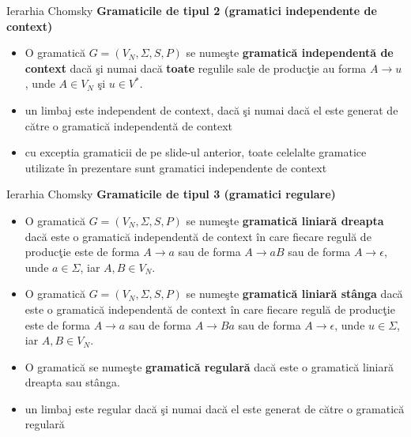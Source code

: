 \documentclass[pdf]{beamer}
\begin{document}
\begin{frame}{Ierarhia Chomsky}
\textbf{Gramaticile de tipul 2 (gramatici independente de context)}
\begin{itemize}
\item
O gramatică $G = (V_{N}, \Sigma, S, P )$ se numeşte \textbf{gramatică independentă de context} dacă şi numai dacă \textbf{toate} regulile sale de producţie au forma $A \rightarrow u$, unde $A \in V_{N}$ şi $u \in V^{*}$.
\item
un limbaj este independent de context, dacă şi numai dacă el este generat de către o gramatică independentă de context
\item
cu exceptia gramaticii de pe slide-ul anterior, toate celelalte gramatice utilizate în prezentare sunt gramatici independente de context
\end{itemize}
\end{frame}



\begin{frame}{Ierarhia Chomsky}
\textbf{Gramaticile de tipul 3 (gramatici regulare)}
\begin{itemize}
\item
O gramatică $G = (V_{N}, \Sigma, S, P )$ se numeşte \textbf{gramatică liniară dreapta} dacă este o gramatică independentă de context în care fiecare regulă de producţie este de forma $A \rightarrow a$ sau de forma $A \rightarrow aB$ sau de forma $A \rightarrow \epsilon$, unde $a \in \Sigma$, iar $A, B \in V_{N}$.
\item
O gramatică $G = (V_{N}, \Sigma, S, P )$ se numeşte \textbf{gramatică liniară stânga} dacă este o gramatică independentă de context în care fiecare regulă de producţie este de forma $A \rightarrow a$ sau de forma $A \rightarrow Ba$ sau de forma $A \rightarrow \epsilon$, unde $u \in \Sigma$, iar $A, B \in V_{N}$.
\item
O gramatică se numeşte \textbf{gramatică regulară} dacă este o gramatică liniară dreapta sau stânga.
\item
un limbaj este regular dacă şi numai dacă el este generat de către o gramatică regulară
\end{itemize}
\end{frame}
\end{document}
